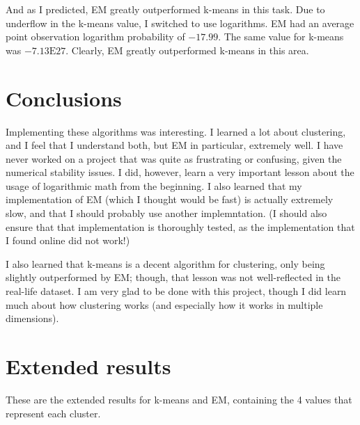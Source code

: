 \documentclass{journal}
\begin{document}
And as I predicted, EM greatly outperformed k-means in this task. Due to
underflow in the k-means value, I switched to use logarithms. EM had an average
point observation logarithm probability of $-17.99$. The same value for k-means
was $-7.13\mathrm{E}{27}$. Clearly, EM greatly outperformed k-means in this
area.

\section{Conclusions}
Implementing these algorithms was interesting. I learned a lot about clustering,
and I feel that I understand both, but EM in particular, extremely well. I have
never worked on a project that was quite as frustrating or confusing, given the
numerical stability issues. I did, however, learn a very important lesson about
the usage of logarithmic math from the beginning. I also learned that
my implementation of EM (which I thought would be fast) is actually extremely
slow, and that I should probably use another implemntation. (I should also
ensure that that implementation is thoroughly
tested, as the implementation that I found online did not work!)

I also learned that k-means is a decent algorithm for clustering, only being
slightly outperformed by EM; though,
that lesson was not well-reflected in the real-life dataset. I am very glad to
be done with this project, though I did learn much about how clustering
works (and especially how it works in multiple dimensions).

\clearpage{}
\appendix
\section{Extended results}\label{app:results}
These are the extended results for k-means and EM, containing the 4 values that
represent each cluster.
\end{document}
